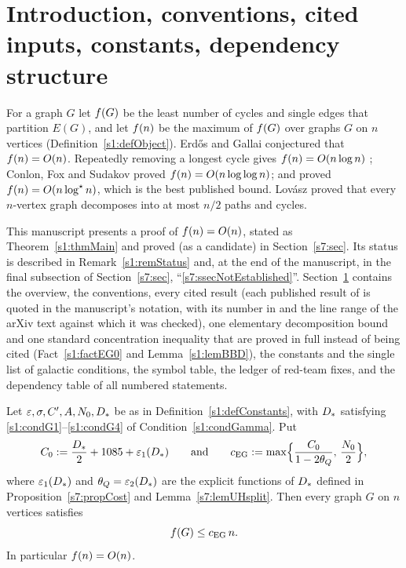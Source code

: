 \section{Introduction, conventions, cited inputs, constants, dependency structure}\label{s1:sec}

For a graph $G$ let $f(G)$ be the least number of cycles and single edges that
partition $E(G)$, and let $f(n)$ be the maximum of $f(G)$ over graphs $G$ on
$n$ vertices (Definition~\ref{s1:defObject}). Erd\H{o}s and Gallai \cite{EG66}
conjectured that $f(n)=O(n)$. Repeatedly removing a longest cycle gives
$f(n)=O(n\log n)$ \cite{EG66}; Conlon, Fox and Sudakov \cite{CFS14} proved
$f(n)=O(n\log\log n)$; and \BMnames{} \cite{BM} proved $f(n)=O(n\log^{\star} n)$,
which is the best published bound. Lov\'asz \cite{Lov68} proved that every
$n$-vertex graph decomposes into at most $n/2$ paths and cycles.

This manuscript presents a \candidate{} proof of $f(n)=O(n)$, stated as
Theorem~\ref{s1:thmMain} and proved (as a candidate) in Section~\ref{s7:sec}.
Its status is described in Remark~\ref{s1:remStatus} and, at the end of the
manuscript, in the final subsection of Section~\ref{s7:sec}, ``\ref{s7:ssecNotEstablished}''. Section~\ref{s1:sec}
contains the overview, the conventions, every cited result (each published result
of \cite{BM} is quoted in the manuscript's notation, with its number in \cite{BM}
and the line range of the arXiv text against which it was checked), one
elementary decomposition bound and one standard concentration inequality
that are proved in full instead of being cited (Fact~\ref{s1:factEG0} and
Lemma~\ref{s1:lemBBD}), the constants
and the single list of galactic conditions, the symbol table, the ledger of
red-team fixes, and the dependency table of all numbered statements.

\begin{theorem}\label{s1:thmMain}
Let $\varepsilon,\sigma,C',A,N_{0},D_{*}$ be as in
Definition~\ref{s1:defConstants}, with $D_{*}$ satisfying
\ref{s1:condG1}--\ref{s1:condG4} of Condition~\ref{s1:condGamma}. Put
\[
C_{0}\mathrel{:=} \frac{D_{*}}{2}+1085+\varepsilon_{1}(D_{*})
\qquad\text{and}\qquad
c_{\mathrm{EG}}\mathrel{:=}\max\Bigl\{\frac{C_{0}}{1-2\theta_{Q}},\,\frac{N_{0}}{2}\Bigr\},
\]
where $\varepsilon_{1}(D_{*})$ and $\theta_{Q}=\varepsilon_{2}(D_{*})$ are the explicit functions
of $D_{*}$ defined in Proposition~\ref{s7:propCost} and
Lemma~\ref{s7:lemUHsplit}. Then every graph $G$ on $n$ vertices satisfies
\[
f(G)\le c_{\mathrm{EG}}\, n .
\]
In particular $f(n)=O(n)$.
\end{theorem}

